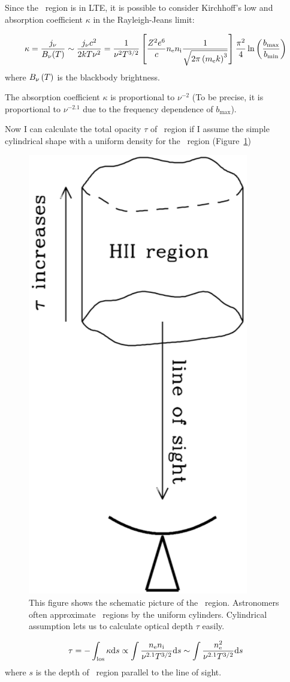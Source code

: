 Since the \ih~region is in LTE, it is possible to consider Kirchhoff's low and absorption coefficient $\kappa$ in the Rayleigh-Jeans limit:

\begin{equation}\label{eq:essential_radio4n51}
    \kappa=\frac{j_{\nu}}{B_{\nu}(T)} \sim \frac{j_{\nu} c^2}{2 k T \nu^2} = \frac{1}{\nu^2 T^{3/2}}\left[\frac{Z^2 e^6}{c} n_{\mathrm{e}} n_{\mathrm{i}} \frac{1}{\sqrt{2\pi\left(m_{\mathrm{e}} k\right)^3}}\right] \frac{\pi^2}{4} \ln \left(\frac{b_{\max}}{b_{\min}}\right)
\end{equation}
where $B_{\nu}\left(T\right)$ is the blackbody brightness.

The absorption coefficient $\kappa$ is proportional to $\nu^{-2}$ (To be precise, it is proportional to $\nu^{-2.1}$ due to the frequency dependence of $b_{\max}$).

Now I can calculate the total opacity $\tau$ of \ih~region if I assume the simple cylindrical shape with a uniform density for the \ih~region (Figure~\ref{fig:nrao_radio4n7})

\begin{figure}[htbp]
	\centering
	\includegraphics[width=.3\linewidth]{Chapter_2/Figures/NRAO_radio4n7.png}
    \caption[The schematic picture of \ih~region]{\label{fig:nrao_radio4n7}
        This figure shows the schematic picture of the \ih~region.
        Astronomers often approximate \ih~regions by the uniform cylinders.
        Cylindrical assumption lets us to calculate optical depth $\tau$ easily.
    }
\end{figure}

\begin{equation}\label{eq:essential_radio4n53}
\tau=-\int_{\mathrm{los}} \kappa \mathrm{d} s \propto \int \frac{n_{\mathrm{e}} n_{\mathrm{i}}}{\nu^{2.1} T^{3/2}} \mathrm{d} s \sim \int \frac{n_{\mathrm{e}}^2}{\nu^{2.1} T^{3/2}} \mathrm{d} s
\end{equation}
where $s$ is the depth of \ih~region parallel to the line of sight.

